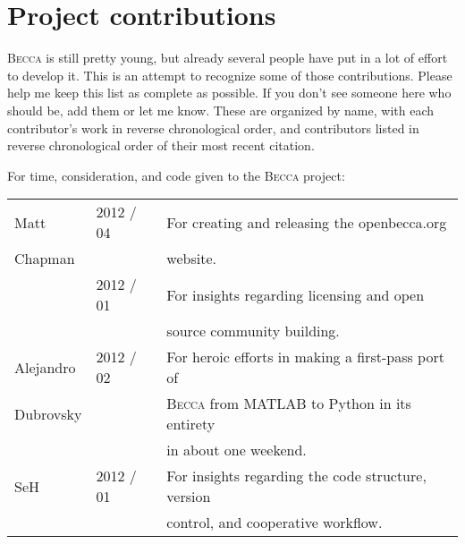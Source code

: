 \chapter{Project contributions}

\textsc{Becca} is still pretty young, but already several people have put in a lot of effort to develop it. This is an attempt to recognize some of those contributions. Please help me keep this list as complete as possible. If you don't see someone here who should be, add them or let me know. These are organized by name, with each contributor's work in reverse chronological order, and contributors listed in reverse chronological order of their most recent citation.

For time, consideration, and code given to the \textsc{Becca} project:

\begin{tabular}{|l|l|l|}
\hline
Matt & 2012 / 04 & For creating and releasing the openbecca.org \\
Chapman &&website.~\cite{chapman12Code} \\
& 2012 / 01 & For insights regarding licensing and open \\
&&source community building. \\
\hline
Alejandro &2012 / 02& For heroic efforts in making a first-pass port of \\
Dubrovsky&&\textsc{Becca} from MATLAB to Python in its entirety \\
 && in about one weekend.\\
\hline
SeH & 2012 / 01& For insights regarding the code structure, version \\
&&control, and cooperative workflow.\\
\hline
\end{tabular}
